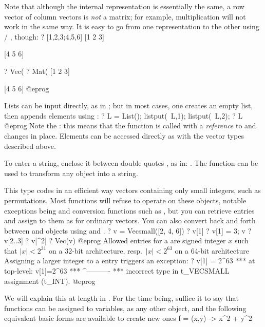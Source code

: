 Note that although the internal representation is essentially the same, a row
vector of column vectors is \emph{not} a matrix; for example, multiplication
will not work in the same way. It is easy to go from one representation to
the other using  / , though:
\bprog
? [1,2,3;4,5,6]
[1 2 3]

[4 5 6]

? Vec(%
? Mat(%
[1 2 3]

[4 5 6]
@eprog

%
Lists can be input directly, as in ; but in most cases,
one creates an empty list, then appends elements using :
\bprog
  ? L = List(); listput(~L,1); listput(~L,2);
  ? L
@eprog\noindent
Note the : this means that the function is called with a
\emph{reference} to  and changes  in place. Elements can be
accessed directly as with the vector types described above.

%
To enter a string, enclose it between double quotes , as in:
. The function  can be used to transform any
object into a string.

%
This type codes in an efficient way vectors containing only small integers,
such as permutations. Most  functions will refuse to operate on these
objects, notable exceptions being  and conversion functions
such as , but you can retrieve entries and assign to them as
for ordinary vectors. You can also convert back and forth between
 and  objects using  and .
\bprog
? v = Vecsmall([2, 4, 6])
? v[1]
? v[1] = 3; v
? v[2..3]
? v[^2]
? Vec(v)
@eprog\noindent
Allowed entries for a  are signed integer $x$ such that $|x| <
2^{31}$ on a 32-bit architecture, resp.~$|x| < 2^{63}$ on a 64-bit
architecture Assigning a larger integer to a  entry triggers an
exception:
\bprog
? v[1] = 2^63
  ***   at top-level: v[1]=2^63
  ***                 ^----------
  ***   incorrect type in t_VECSMALL assignment (t_INT).
@eprog

%
We will explain this at length in . For the time
being, suffice it to say that functions can be assigned to variables, as any
other object, and the following equivalent basic forms are available to
create new ones
\bprog
  f = (x,y) -> x^2 + y^2

